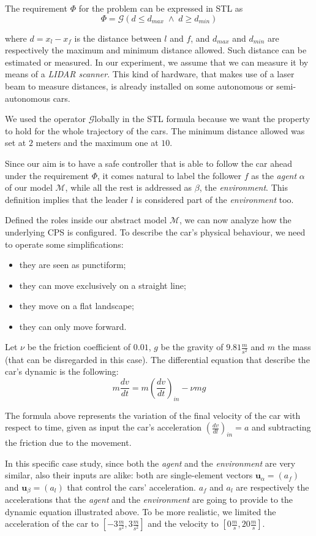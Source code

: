 The requirement $\Phi$ for the problem can be expressed in STL as
$$ \Phi =  \mathcal{G}(d \leq d_{max} \; \wedge \; d \geq d_{min}) $$

where $d = x_l - x_f$ is the distance between $l$ and $f$, and $d_{max}$ and $d_{min}$ are respectively the maximum and minimum distance allowed.
Such distance can be estimated or measured.
In our experiment, we assume that we can measure it by means of a \textit{LIDAR scanner}.
This kind of hardware, that makes use of a laser beam to measure distances, is already installed on some autonomous or semi-autonomous cars.

We used the operator $\mathcal{G}$lobally in the STL formula because we want the property to hold for the whole trajectory of the cars.
The minimum distance allowed was set at $2$ meters and the maximum one at $10$.

Since our aim is to have a safe controller that is able to follow the car ahead under the requirement $\Phi$, it comes natural to label the follower $f$ as the \textit{agent} $\alpha$ of our model $\mathcal{M}$, while all the rest is addressed as $\beta$, the \textit{environment}.
This definition implies that the leader $l$ is considered part of the \textit{environment} too.

Defined the roles inside our abstract model $\mathcal{M}$, we can now analyze how the underlying CPS is configured.
To describe the car's physical behaviour, we need to operate some simplifications:
\begin{itemize}
  \item they are seen as punctiform;
  \item they can move exclusively on a straight line;
  \item they move on a flat landscape;
  \item they can only move forward.
\end{itemize}

Let $\nu$ be the friction coefficient of $0.01$, $g$ be the gravity of $9.81 \frac{m}{s^2}$ and $m$ the mass (that can be disregarded in this case).
The differential equation that describe the car's dynamic is the following:
$$ m \frac{dv}{dt} = m \left( \frac{dv}{dt} \right)_{in}  - \nu mg  $$

The formula above represents the variation of the final velocity of the car with respect to time, given as input the car's acceleration  $\left( \frac{dv}{dt} \right)_{in} = a$ and subtracting the friction due to the movement.

In this specific case study, since both the \textit{agent} and the \textit{environment} are very similar, also their inputs are alike: both are single-element vectors $\textbf{u}_\alpha = (a_f)$ and $\textbf{u}_\beta = (a_l)$ that control the cars' acceleration.
$a_f$ and $a_l$ are respectively the accelerations that the \textit{agent} and the \textit{environment} are going to provide to the dynamic equation illustrated above.
To be more realistic, we limited the acceleration of the car to $[-3 \frac{m}{s^2}, 3 \frac{m}{s^2}]$ and the velocity to $[0 \frac{m}{s}, 20 \frac{m}{s}]$.

